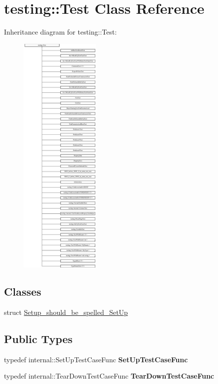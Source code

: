 \hypertarget{classtesting_1_1_test}{}\section{testing\+:\+:Test Class Reference}
\label{classtesting_1_1_test}
Inheritance diagram for testing\+:\+:Test\+:\begin{figure}[H]
\begin{center}
\leavevmode
\includegraphics[height=12.000000cm]{classtesting_1_1_test}
\end{center}
\end{figure}
\subsection*{Classes}
\begin{DoxyCompactItemize}
\item 
struct \mbox{\hyperlink{structtesting_1_1_test_1_1_setup__should__be__spelled___set_up}{Setup\+\_\+should\+\_\+be\+\_\+spelled\+\_\+\+Set\+Up}}
\end{DoxyCompactItemize}
\subsection*{Public Types}
\begin{DoxyCompactItemize}
\item 
\mbox{\label{classtesting_1_1_test_a5f2a051d1d99c9b784c666c586186cf9}} 
typedef internal\+::\+Set\+Up\+Test\+Case\+Func {\bfseries Set\+Up\+Test\+Case\+Func}
\item 
\mbox{\label{classtesting_1_1_test_aa0f532e93b9f3500144c53f31466976c}} 
typedef internal\+::\+Tear\+Down\+Test\+Case\+Func {\bfseries Tear\+Down\+Test\+Case\+Func}
\end{DoxyCompactItemize}
